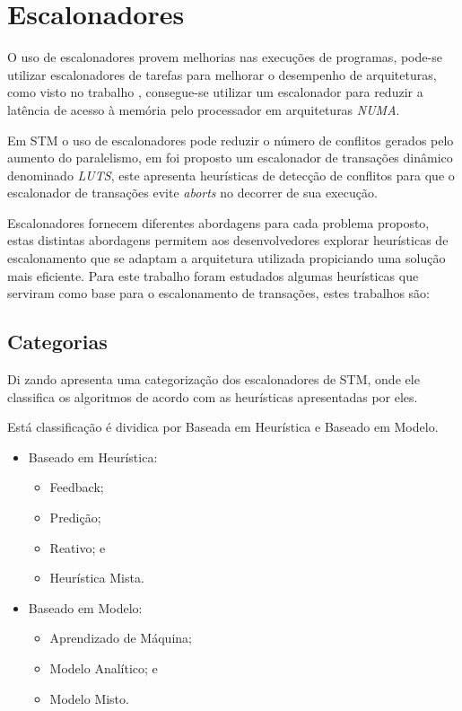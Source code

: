 \documentclass[diss,capa]{texufpel}
\begin{document}
\chapter{Escalonadores}
\label{chapter::escalonadores}

O uso de escalonadores provem melhorias nas execuções de programas, pode-se utilizar escalonadores de tarefas para melhorar o desempenho de arquiteturas, como visto no trabalho \cite{Rodolfo:2014}, consegue-se utilizar um escalonador para reduzir a latência de acesso à memória pelo processador em arquiteturas \emph{NUMA}.

Em STM o uso de escalonadores pode reduzir o número de conflitos gerados pelo aumento do paralelismo, em \cite{Nicacio2012} foi proposto um escalonador de transações dinâmico denominado \emph{LUTS}, este apresenta heurísticas de detecção de conflitos para que o escalonador de transações evite \emph{aborts} no decorrer de sua execução.



Escalonadores fornecem diferentes abordagens para cada problema proposto, estas distintas abordagens permitem aos desenvolvedores explorar heurísticas de escalonamento que se adaptam a arquitetura utilizada propiciando uma solução mais eficiente. Para este trabalho foram estudados algumas heurísticas que serviram como base para o escalonamento de transações, estes trabalhos são:

\section{Categorias}

Di zando apresenta uma categorização dos escalonadores de STM, onde ele classifica os algoritmos de acordo com as heurísticas apresentadas por eles.

Está classificação é dividica por Baseada em Heurística e Baseado em Modelo.

\begin{itemize}
	\item Baseado em Heurística:
	\begin{itemize}
	    \item Feedback;
	    \item Predição;
	    \item Reativo; e
	    \item Heurística Mista.
	\end{itemize}
	\item Baseado em Modelo:
	\begin{itemize}
	    \item Aprendizado de Máquina;
	    \item Modelo Analítico; e
	    \item Modelo Misto.
	\end{itemize}
\end{itemize}
\end{document}
